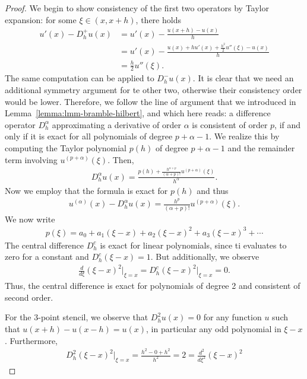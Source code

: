 


\begin{proof}
  We begin to show consistency of the first two operators by Taylor
  expansion: for some $\xi\in(x,x+h)$, there holds
  \begin{align*}
    u'(x) - D^+_h u(x) &= u'(x) - \frac{u(x+h) - u(x)}h \\
    &= u'(x) - \frac{u(x)+h u'(x) + \tfrac{h^2}{2} u''(\xi) - u(x)}h
    \\
    &= \tfrac h2 u''(\xi).
  \end{align*}
  The same computation can be applied to $D^-_h u(x)$. It is clear
  that we need an additional symmetry argument for te other two,
  otherwise their consistency order would be lower. Therefore, we
  follow the line of argument that we introduced in
  Lemma~\ref{lemma:lmm-bramble-hilbert}, and which here reads: a
  difference operator $D^\alpha_h$ approximating a derivative of order
  $\alpha$ is consistent of order $p$, if and only if it is exact for all
  polynomials of degree $p+\alpha-1$. We realize this by computing the
  Taylor polynomial $p(h)$ of degree $p+\alpha-1$ and the remainder term
  involving $u^{(p+\alpha)}(\xi)$. Then,
  \begin{gather*}
    D^\alpha_h u(x) = \frac{p(h)+\frac{h^{\alpha+p}}{(\alpha+p)!}u^{(p+\alpha)}(\xi)}{h^\alpha}.
  \end{gather*}
  Now we employ that the formula is exact for $p(h)$ and thus
  \begin{gather*}
    u^{(\alpha)}(x) - D^\alpha_h u(x)
    = \frac{h^p}{(\alpha+p)!}u^{(p+\alpha)}(\xi).
  \end{gather*}
  We now write
  \begin{gather*}
    p(\xi) = a_0 + a_1 (\xi-x) + a_2 (\xi-x)^2 + a_3 (\xi-x)^3 + \cdots
  \end{gather*}
  The central difference $D^c_h$ is exact for linear polynomials,
  since ti evaluates to zero for a constant and $D^c_h (\xi-x) =
  1$. But additionally, we observe
  \begin{gather*}
    \frac{d}{d\xi} (\xi-x)^2 \Bigr|_{\xi=x}
    = D^c_h (\xi-x)^2 \Bigr|_{\xi=x}= 0.
  \end{gather*}
  Thus, the central difference is exact for polynomials of degree 2
  and consistent of second order.

  For the 3-point stencil, we observe that $D^2_h u(x)=0$ for any
  function $u$ such that $u(x+h) - u(x-h) = u(x)$, in particular any
  odd polynomial in $\xi-x$. Furthermore,
  \begin{gather*}
    D^2_h  (\xi-x)^2 \Bigr|_{\xi=x}= \frac{h^2-0+h^2}{h^2}
    = 2 = \frac{d^2}{d\xi^2} (\xi-x)^2
  \end{gather*}
\end{proof}

